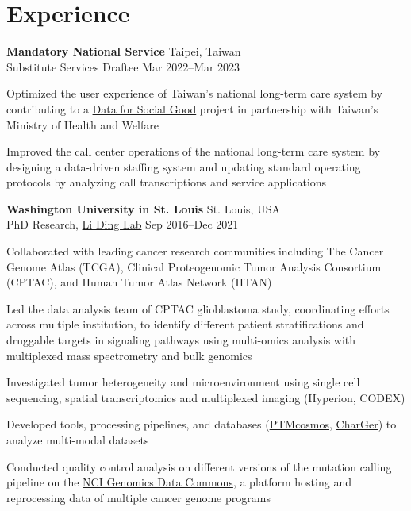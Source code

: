 \section{Experience}

\begin{entrylist}

\item \textbf{Mandatory National Service} \hfill Taipei, Taiwan\\
Substitute Services Draftee \hfill
Mar 2022--Mar 2023
\begin{detaillist}
    \item Optimized the user experience of Taiwan's national long-term care system by contributing to a \href{https://d4sg.org/}{Data for Social Good} project in partnership with Taiwan's Ministry of Health and Welfare
    \item Improved the call center operations of the national long-term care system by designing a data-driven staffing system and updating standard operating protocols by analyzing call transcriptions and service applications
\end{detaillist}

\item \textbf{Washington University in St. Louis} \hfill St. Louis, USA\\
PhD Research, \href{https://dinglab.wustl.edu/}{Li Ding Lab} \hfill
Sep 2016--Dec 2021
\begin{detaillist}
    \item Collaborated with leading cancer research communities including The Cancer Genome Atlas (TCGA), Clinical Proteogenomic Tumor Analysis Consortium (CPTAC), and Human Tumor Atlas Network (HTAN)
    \item Led the data analysis team of CPTAC glioblastoma study, coordinating efforts across multiple institution, to identify different patient stratifications and druggable targets in signaling pathways using multi-omics analysis with multiplexed mass spectrometry and bulk genomics
    \item Investigated tumor heterogeneity and microenvironment using single cell sequencing, spatial transcriptomics and multiplexed imaging (Hyperion, CODEX)
    \item Developed tools, processing pipelines, and databases (\href{https://ptmcosmos.wustl.edu/}{PTMcosmos}, \href{https://github.com/ding-lab/CharGer}{CharGer}) to analyze multi-modal datasets
    \item Conducted quality control analysis on different versions of the mutation calling pipeline on the \href{https://gdc.cancer.gov/}{NCI Genomics Data Commons}, a platform hosting and reprocessing data of multiple cancer genome programs
\end{detaillist}


\end{entrylist}
